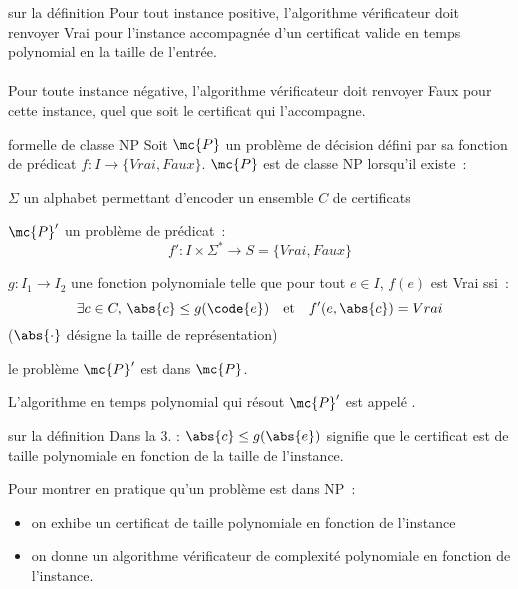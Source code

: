 \begin{remarque}{}{sur la définition}
    Pour tout instance positive, l'algorithme vérificateur doit renvoyer Vrai pour l'instance accompagnée d'un certificat valide en temps polynomial en la taille de l'entrée.\\\\
    Pour toute instance négative, l'algorithme vérificateur doit renvoyer Faux pour cette instance, quel que soit le certificat qui l'accompagne.
\end{remarque}

\begin{definition}{}{formelle de classe NP}
    Soit $\mc{P}$ un problème de décision défini par sa fonction de prédicat $f: I \to \{Vrai, Faux\}$. $\mc{P}$ est de classe NP lorsqu'il existe~:
    \begin{enumeratebf}
        \item $\Sigma$ un alphabet permettant d'encoder un ensemble $C$ de certificats
        \item $\mc{P}'$ un problème de prédicat~:
        $$f': I\times \Sigma^* \to  S=\{Vrai, Faux\}$$
        \item $g : I_1 \to I_2$ une fonction polynomiale telle que pour tout $e\in I$, $f(e)$ est Vrai ssi~:
        $$\exists c \in C,\, \abs{c} \leq g(\code{e}) \quad \text{et} \quad f'(e,\abs{c}) = Vrai$$
        ($\abs{\cdot}$ désigne la taille de représentation)
        \item le problème $\mc{P}'$ est dans $\mc{P}$.
    \end{enumeratebf}
    L'algorithme en temps polynomial qui résout $\mc{P}'$ est appelé .
\end{definition}

\begin{remarque}{}{sur la définition}
    Dans la 3. : $\abs{c} \leq g(\abs{e})$ signifie que le certificat est de taille polynomiale en fonction de la taille de l'instance.
\end{remarque}

\begin{remarque}{}{}
    Pour montrer en pratique qu'un problème est dans NP~:
    \begin{itemize}
        \item on exhibe un certificat de taille polynomiale en fonction de l'instance
        \item on donne un algorithme vérificateur de complexité polynomiale en fonction de l'instance.
    \end{itemize}
\end{remarque}

